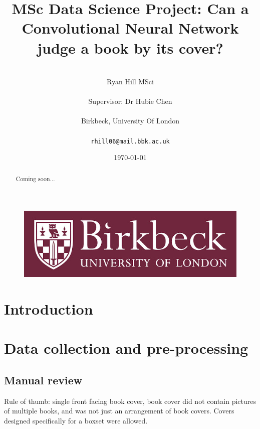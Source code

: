 \documentclass[12pt]{article}
\numberwithin{equation}{section}
\numberwithin{figure}{section}
\begin{document}
\renewcommand\citeform[1]{[#1]}
%
\title{MSc Data Science Project: Can a Convolutional Neural Network judge a book by its cover?}
\author{\\Ryan Hill MSci\\\\
Supervisor: Dr Hubie Chen\\\\
Birkbeck, University Of London\\\\
\texttt{rhill06@mail.bbk.ac.uk}}
\date{\today}
\maketitle
\thispagestyle{empty}
\graphicspath{{images/}}
\begin{abstract}
	Coming soon...
\end{abstract}
\begin{figure}[!b]
	\centering
	\includegraphics[scale=0.4]{bbk_logo.jpg}
\end{figure}

\clearpage
%
{\hypersetup{linkcolor=black}
\tableofcontents}
\thispagestyle{empty}
\clearpage
%
\setcounter{page}{1}
\section{Introduction} %
\label{sec:intro}


\section{Data collection and pre-processing} 
\label{sec:Data_collection_and_pre-processing} 
\subsection{Manual review} 
\label{sub:Manual_review} 
Rule of thumb: single front facing book cover, book cover did not contain pictures of multiple books, and was not just an arrangement of book covers. Covers designed specifically for a boxset were allowed.








 
\end{document}
